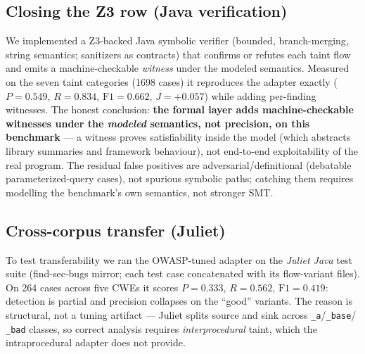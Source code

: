 \documentclass[11pt]{article}
\begin{document}
\subsection{Closing the Z3 row (Java verification)}
We implemented a Z3-backed Java symbolic verifier (bounded, branch-merging,
string semantics; sanitizers as contracts) that confirms or refutes each taint
flow and emits a machine-checkable \emph{witness} under the modeled semantics. Measured on the seven taint categories
(1698 cases) it reproduces the adapter exactly ($P=0.549$, $R=0.834$,
$\mathrm{F1}=0.662$, $J=+0.057$) while adding per-finding witnesses. The honest
conclusion: \textbf{the formal layer adds machine-checkable witnesses under the
\emph{modeled} semantics, not precision, on this benchmark} --- a witness proves
satisfiability inside the model (which abstracts library summaries and framework
behaviour), not end-to-end exploitability of the real program. The residual false
positives are adversarial/definitional (debatable parameterized-query cases), not
spurious symbolic paths; catching them requires modelling the benchmark's own
semantics, not stronger SMT.

\subsection{Cross-corpus transfer (Juliet)}
To test transferability we ran the OWASP-tuned adapter on the \emph{Juliet Java}
test suite (find-sec-bugs mirror; each test case concatenated with its
flow-variant files). On 264 cases across five CWEs it scores
$P=0.333$, $R=0.562$, $\mathrm{F1}=0.419$: detection is partial and precision
collapses on the ``good'' variants. The reason is structural, not a tuning
artifact --- Juliet splits source and sink across \texttt{\_a}/\texttt{\_base}/
\texttt{\_bad} classes, so correct analysis requires \emph{interprocedural}
taint, which the intraprocedural adapter does not provide.
\end{document}
